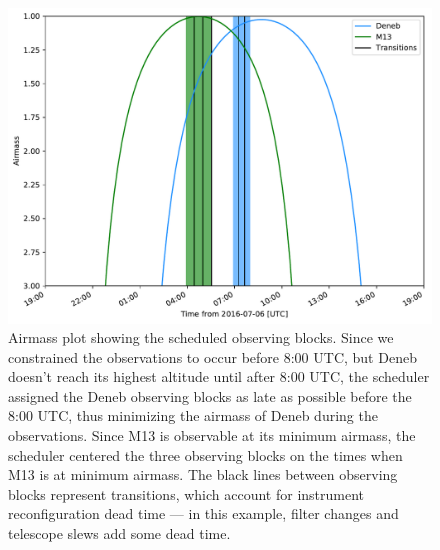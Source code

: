 \begin{subappendices}
\begin{figure}[h]
\centering
\includegraphics[scale=0.5]{astroplan/schedule.pdf}
\caption{Airmass plot showing the scheduled observing blocks. Since we constrained the observations to occur before 8:00 UTC, but Deneb doesn't reach its highest altitude until after 8:00 UTC, the scheduler assigned the Deneb observing blocks as late as possible before the 8:00 UTC, thus minimizing the airmass of Deneb during the observations. Since M13 is observable at its minimum airmass, the scheduler centered the three observing blocks on the times when M13 is at minimum airmass. The black lines between observing blocks represent transitions, which account for instrument reconfiguration dead time --- in this example, filter changes and telescope slews add some dead time.}
\label{fig:schedule}
\end{figure}

\end{subappendices}
%